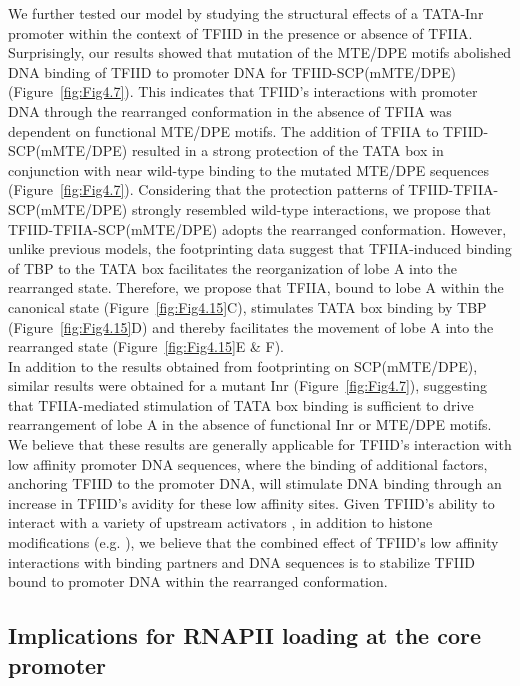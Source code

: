 We further tested our model by studying the structural effects of a TATA-Inr promoter within the context of TFIID in the presence or absence of TFIIA. Surprisingly, our results showed that mutation of the MTE/DPE motifs abolished DNA binding of TFIID to promoter DNA for TFIID-SCP(mMTE/DPE) (Figure~\ref{fig:Fig4.7}). This indicates that TFIID's interactions with promoter DNA through the rearranged conformation in the absence of TFIIA was dependent on functional MTE/DPE motifs. The addition of TFIIA to TFIID-SCP(mMTE/DPE) resulted in a strong protection of the TATA box in conjunction with near wild-type binding to the mutated MTE/DPE sequences (Figure~\ref{fig:Fig4.7}). Considering that the protection patterns of TFIID-TFIIA-SCP(mMTE/DPE) strongly resembled wild-type interactions, we propose that TFIID-TFIIA-SCP(mMTE/DPE) adopts the rearranged conformation. However, unlike previous models, the footprinting data suggest that TFIIA-induced binding of TBP to the TATA box facilitates the reorganization of lobe A into the rearranged state. Therefore, we propose that TFIIA, bound to lobe A within the canonical state (Figure~\ref{fig:Fig4.15}C), stimulates TATA box binding by TBP (Figure~\ref{fig:Fig4.15}D) and thereby facilitates the movement of lobe A into the rearranged state (Figure~\ref{fig:Fig4.15}E \& F). \\
\indent In addition to the results obtained from footprinting on SCP(mMTE/DPE), similar results were obtained for a mutant Inr (Figure~\ref{fig:Fig4.7}), suggesting that TFIIA-mediated stimulation of TATA box binding is sufficient to drive rearrangement of lobe A in the absence of functional Inr or MTE/DPE motifs. We believe that these results are generally applicable for TFIID's interaction with low affinity promoter DNA sequences, where the binding of additional factors, anchoring TFIID to the promoter DNA, will stimulate DNA binding through an increase in TFIID's avidity for these low affinity sites. Given TFIID's ability to interact with a variety of upstream activators \cite{Goodrich_503,Levine_1710}, in addition to histone modifications (e.g. \cite{Jacobson_2000,Vermeulen_2007}), we believe that the combined effect of TFIID's low affinity interactions with binding partners and DNA sequences is to stabilize TFIID bound to promoter DNA within the rearranged conformation.\\

\subsection{Implications for RNAPII loading at the core promoter}

